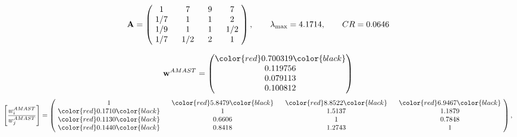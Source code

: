 \begin{example}
\begin{equation*}
\mathbf{A} =
\begin{pmatrix}
$\,\,$ 1 $\,\,$ & $\,\,$7$\,\,$ & $\,\,$9$\,\,$ & $\,\,$7 $\,\,$ \\
$\,\,$ 1/7$\,\,$ & $\,\,$ 1 $\,\,$ & $\,\,$1$\,\,$ & $\,\,$2 $\,\,$ \\
$\,\,$ 1/9$\,\,$ & $\,\,$ 1 $\,\,$ & $\,\,$ 1 $\,\,$ & $\,\,$ 1/2 $\,\,$ \\
$\,\,$ 1/7$\,\,$ & $\,\,$ 1/2$\,\,$ & $\,\,$2$\,\,$ & $\,\,$ 1  $\,\,$ \\
\end{pmatrix},
\qquad
\lambda_{\max} =
4.1714,
\qquad
CR = 0.0646
\end{equation*}

\begin{equation*}
\mathbf{w}^{AMAST} =
\begin{pmatrix}
\color{red} 0.700319\color{black} \\
0.119756\\
0.079113\\
0.100812
\end{pmatrix}\end{equation*}
\begin{equation*}
\left[ \frac{{w}^{AMAST}_i}{{w}^{AMAST}_j} \right] =
\begin{pmatrix}
$\,\,$ 1 $\,\,$ & $\,\,$\color{red} 5.8479\color{black} $\,\,$ & $\,\,$\color{red} 8.8522\color{black} $\,\,$ & $\,\,$\color{red} 6.9467\color{black} $\,\,$ \\
$\,\,$\color{red} 0.1710\color{black} $\,\,$ & $\,\,$ 1 $\,\,$ & $\,\,$1.5137$\,\,$ & $\,\,$1.1879  $\,\,$ \\
$\,\,$\color{red} 0.1130\color{black} $\,\,$ & $\,\,$0.6606$\,\,$ & $\,\,$ 1 $\,\,$ & $\,\,$0.7848 $\,\,$ \\
$\,\,$\color{red} 0.1440\color{black} $\,\,$ & $\,\,$0.8418$\,\,$ & $\,\,$1.2743$\,\,$ & $\,\,$ 1  $\,\,$ \\
\end{pmatrix},
\end{equation*}


\end{example}
